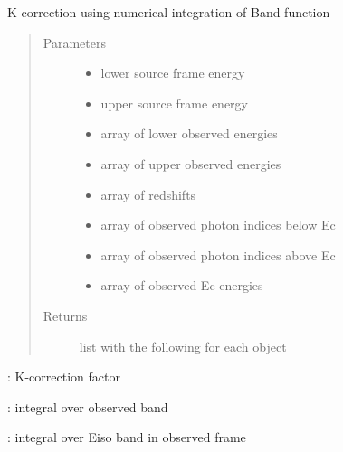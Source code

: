 \documentclass[letterpaper,10pt,english]{sphinxmanual}
\begin{document}
\begin{fulllineitems}
\label{\detokenize{astro_functions:astro.kcorrb}}
K-correction using numerical integration of Band function
\begin{quote}\begin{description}
\item[{Parameters}] \leavevmode\begin{itemize}
\item {} 
 \textendash{} lower source frame energy

\item {} 
 \textendash{} upper source frame energy

\item {} 
 \textendash{} array of lower observed energies

\item {} 
 \textendash{} array of upper observed energies

\item {} 
 \textendash{} array of redshifts

\item {} 
 \textendash{} array of observed photon indices below Ec

\item {} 
 \textendash{} array of observed photon indices above Ec

\item {} 
 \textendash{} array of observed Ec energies

\end{itemize}

\item[{Returns}] \leavevmode
list with the following for each object

\end{description}\end{quote}

\begin{DUlineblock}{0em}
\item[] :  K-correction factor
\item[] :  integral over observed band
\item[] :  integral over Eiso band in observed frame
\end{DUlineblock}

\end{fulllineitems}
\end{document}
